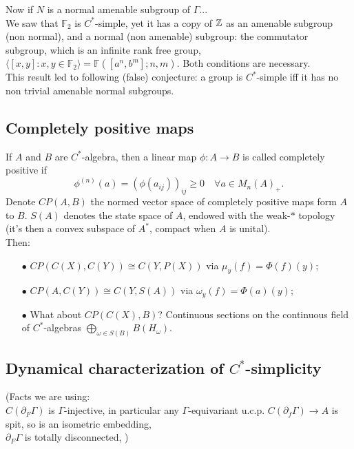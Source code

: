 Now if $N$ is a normal amenable subgroup of $\Gamma$...\\

We saw that $\mathbb F_2$ is $C^*$-simple, yet it has a copy of $\mathbb Z$ as an amenable subgroup (non normal), and a normal (non amenable) subgroup: the commutator subgroup, which is an infinite rank free group, $\langle [x,y ] : x,y \in \mathbb F_2\rangle = \mathbb F([a^n, b^m] ; n,m) $. Both conditions are necessary.\\

This result led to following (false) conjecture: a group is $C^*$-simple iff it has no non trivial amenable normal subgroups.\\

\subsection{Completely positive maps}

If $A$ and $B$ are $C^*$-algebra, then a linear map $\phi : A\rightarrow B$ is called completely positive if 
\[\phi^{(n)}(a) = (\phi(a_{ij}))_{ij} \geq 0 \quad \forall a \in M_n(A)_+.\]
Denote $CP(A,B)$ the normed vector space of completely positive maps form $A$ to $B$. $S(A)$ denotes the state space of $A$, endowed with the weak-$*$ topology (it's then a convex subspace of $A^*$, compact when $A$ is unital).\\

Then: \\
\begin{itemize}
\item[$\bullet$] $CP(C(X),C(Y)) \cong C(Y, P(X))$ via $\mu_y(f) = \Phi(f)(y)$; \\

\item[$\bullet$] $CP(A,C(Y)) \cong C(Y, S(A))$ via $\omega_y(f) = \Phi(a)(y)$;\\

\item[$\bullet$] What about $CP(C(X),B)$? Continuous sections on the continuous field of $C^*$-algebras $\bigoplus_{\omega\in S(B)} B(H_\omega)$.\\
\end{itemize}

\subsection{Dynamical characterization of $C^*$-simplicity}
(Facts we are using: \\ 
$C(\partial_F \Gamma)$ is $\Gamma$-injective, in particular any $\Gamma$-equivariant u.c.p. $C(\partial_f \Gamma)\rightarrow A$ is spit, so is an isometric embedding,\\
$\partial_F \Gamma$ is totally disconnected, ) \\

